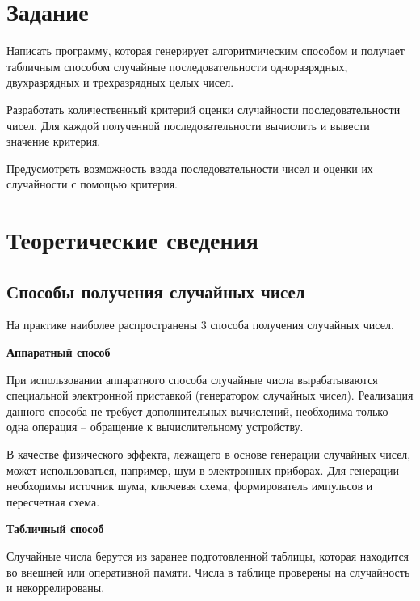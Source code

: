\documentclass[14pt, a4paper]{extarticle}
\begin{document}


\setcounter{page}{2}

\section{Задание}

Написать программу, которая генерирует алгоритмическим способом и получает табличным способом случайные последовательности одноразрядных, двухразрядных и трехразрядных целых чисел.

Разработать количественный критерий оценки случайности последовательности чисел. Для каждой полученной последовательности вычислить и вывести значение критерия.

Предусмотреть возможность ввода последовательности чисел и оценки их случайности с помощью критерия.


\section{Теоретические сведения}

\subsection{Способы получения случайных чисел}

На практике наиболее распространены 3 способа получения случайных чисел.

\textbf{Аппаратный способ}

При использовании аппаратного способа случайные числа вырабатываются специальной электронной приставкой (генератором случайных чисел). Реализация данного способа не требует дополнительных вычислений, необходима только одна операция -- обращение к вычислительному устройству. 

В качестве физического эффекта, лежащего в основе генерации случайных чисел, может использоваться, например, шум в электронных приборах.  Для генерации необходимы источник шума, ключевая схема, формирователь импульсов и пересчетная схема.



\textbf{Табличный способ}

Случайные числа берутся из заранее подготовленной таблицы, которая находится во внешней или оперативной памяти. Числа в таблице проверены на случайность и некоррелированы.
\end{document}
